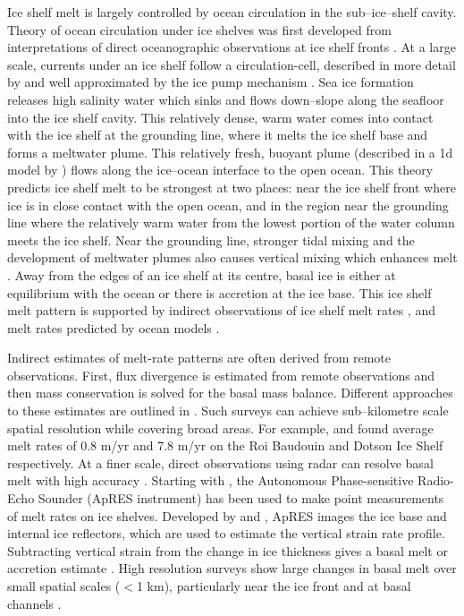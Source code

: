 Ice shelf melt is largely controlled by ocean circulation in the sub--ice--shelf cavity. Theory of ocean circulation under ice shelves was first developed from interpretations of direct oceanographic observations at ice shelf fronts \cite [e.g.][] {jacobs1979circulation}.
At a large scale, currents under an ice shelf follow a circulation-cell, described in more detail by \cite{jacobs1992melting} and well approximated by the ice pump mechanism \citep{lewis1986ice}.
Sea ice formation releases high salinity water which sinks and flows down--slope along the seafloor into the ice shelf cavity. This relatively dense, warm water comes into contact with the ice shelf at the grounding line, where it melts the ice shelf base and forms a meltwater plume. This relatively fresh, buoyant plume (described in a 1d model by \cite{jenkins1991one}) flows along the ice--ocean interface to the open ocean. 
This theory predicts ice shelf melt to be strongest at two places: near the ice shelf front where ice is in close contact with the open ocean, and in the region near the grounding line where the relatively warm water from the lowest portion of the water column meets the ice shelf. Near the grounding line, stronger tidal mixing and the development of meltwater plumes also causes vertical mixing which enhances melt \citep{macayeal1984thermohaline, macayeal1985evolution}. Away from the edges of an ice shelf at its centre, basal ice is either at equilibrium with the ocean or there is accretion at the ice base. This ice shelf melt pattern is supported by indirect observations of ice shelf melt rates \cite [e.g.][] {rignot2013ice, mankoff2012role,goldberg2019accurately}, and melt rates predicted by ocean models \cite [e.g.][] {goldberg2019accurately}.

Indirect estimates of melt-rate patterns are often derived from remote observations. First, flux divergence is estimated from remote observations and then mass conservation is solved for the basal mass balance. Different approaches to these estimates are outlined in \cite{berger2017detecting}. Such surveys can achieve sub--kilometre scale spatial resolution while covering broad areas. For example, \cite {berger2017detecting} and \cite{gourmelen2017channelized} found average melt rates of 0.8 m/yr and 7.8 m/yr on the Roi Baudouin and Dotson Ice Shelf respectively.
At a finer scale, direct observations using radar can resolve basal melt with high accuracy \cite [e.g.][] {vavnkova2020observations,young2018resolving}. Starting with \cite{corr2002precise}, the Autonomous Phase-sensitive Radio-Echo Sounder (ApRES instrument) has been used to make point measurements of melt rates on ice shelves. Developed by \cite{brennan2014phase} and \cite{nicholls2015ground}, ApRES images the ice base and internal ice reflectors, which are used to estimate the vertical strain rate profile. Subtracting vertical strain from the change in ice thickness gives a basal melt or accretion estimate \citep{brennan2014phase}. 
High resolution surveys show large changes in basal melt over small spatial scales ($<$1 km), particularly near the ice front \cite [e.g.][] {stewart2019basal} and at basal channels \cite [e.g.][] {stanton2013channelized, dutrieux2014basal,marsh2016high}.

